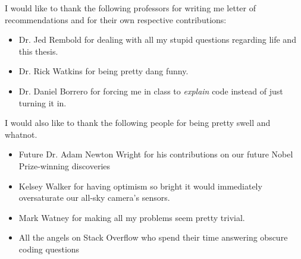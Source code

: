 I would like to thank the following professors for writing me letter of recommendations and for their own respective contributions:
\begin{itemize}
	\item Dr. Jed Rembold for dealing with all my stupid questions regarding life and this thesis.

	\item Dr. Rick Watkins for being pretty dang funny.

	\item Dr. Daniel Borrero for forcing me in class to \textit{explain} code instead of just turning it in.

\end{itemize}
I would also like to thank the following people for being pretty swell and whatnot.

\begin{itemize}
	\item Future Dr. Adam Newton Wright for his contributions on our future Nobel Prize-winning discoveries

	\item Kelsey Walker for having optimism so bright it would immediately oversaturate our all-sky camera's sensors.

	\item Mark Watney for making all my problems seem pretty trivial.

	\item All the angels on Stack Overflow who spend their time answering obscure coding questions
\end{itemize}
